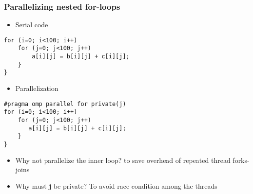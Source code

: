 \documentclass{beamer}
\begin{document}
\begin{frame}
\frametitle{Parallelizing nested for-loops}

\begin{block}{}

\begin{itemize}
 \item Serial code
\end{itemize}

\noindent






\begin{verbatim}
for (i=0; i<100; i++)
    for (j=0; j<100; j++)
        a[i][j] = b[i][j] + c[i][j];
    }
}

\end{verbatim}


\begin{itemize}
\item Parallelization
\end{itemize}

\noindent







\begin{verbatim}
#pragma omp parallel for private(j)
for (i=0; i<100; i++)
    for (j=0; j<100; j++)
       a[i][j] = b[i][j] + c[i][j];
    }
}

\end{verbatim}


\begin{itemize}
\item Why not parallelize the inner loop? to save overhead of repeated thread forks-joins

\item Why must \textbf{j} be private? To avoid race condition among the threads
\end{itemize}

\noindent
\end{block}
\end{frame}
\end{document}
